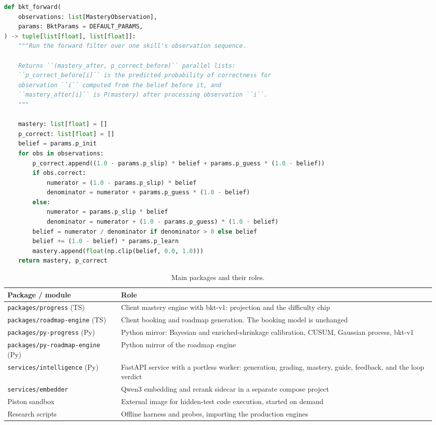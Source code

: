 \noindent\begin{minipage}{\linewidth}
\begin{lstlisting}[language=Python, caption={The shipped BKT forward filter, which realizes Equation~\eqref{eq:bkt-update}.}, label={lst:bktforward}]
def bkt_forward(
    observations: list[MasteryObservation],
    params: BktParams = DEFAULT_PARAMS,
) -> tuple[list[float], list[float]]:
    """Run the forward filter over one skill's observation sequence.

    Returns ``(mastery_after, p_correct_before)`` parallel lists:
    ``p_correct_before[i]`` is the predicted probability of correctness for
    observation ``i`` computed from the belief before it, and
    ``mastery_after[i]`` is P(mastery) after processing observation ``i``.
    """

    mastery: list[float] = []
    p_correct: list[float] = []
    belief = params.p_init
    for obs in observations:
        p_correct.append((1.0 - params.p_slip) * belief + params.p_guess * (1.0 - belief))
        if obs.correct:
            numerator = (1.0 - params.p_slip) * belief
            denominator = numerator + params.p_guess * (1.0 - belief)
        else:
            numerator = params.p_slip * belief
            denominator = numerator + (1.0 - params.p_guess) * (1.0 - belief)
        belief = numerator / denominator if denominator > 0 else belief
        belief += (1.0 - belief) * params.p_learn
        mastery.append(float(np.clip(belief, 0.0, 1.0)))
    return mastery, p_correct
\end{lstlisting}
\end{minipage}

\begin{table}[H]
\centering
\footnotesize
\caption{Main packages and their roles.}
\label{tab:packages}
\begin{tabular}{p{4.8cm} p{7.6cm}}
\toprule
\textbf{Package / module} & \textbf{Role} \\
\midrule
\texttt{packages/progress} (TS) & Client mastery engine with bkt-v1: projection and the difficulty chip \\
 \texttt{packages/roadmap-engine} (TS) & Client booking and roadmap generation. The booking model is unchanged \\
\texttt{packages/py-progress} (Py) & Python mirror: Bayesian and enriched-shrinkage calibration, CUSUM, Gaussian process, bkt-v1 \\
\texttt{packages/py-roadmap-engine} (Py) & Python mirror of the roadmap engine \\
\texttt{services/intelligence} (Py) & FastAPI service with a portless worker: generation, grading, mastery, guide, feedback, and the loop verdict \\
\texttt{services/embedder} & Qwen3 embedding and rerank sidecar in a separate compose project \\
Piston sandbox & External image for hidden-test code execution, started on demand \\
 Research scripts & Offline harness and probes, importing the production engines \\
\bottomrule
\end{tabular}
\end{table}

